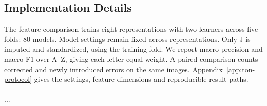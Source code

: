 \documentclass{article}
\begin{document}
    \subsection{Implementation Details}
The feature comparison trains eight representations with two learners across five folds: 80 models. Model settings remain fixed across representations. Only J is imputed and standardized, using the training fold. We report macro-precision and macro-F1 over A--Z, giving each letter equal weight. A paired comparison counts corrected and newly introduced errors on the same images. Appendix~\ref{app:ton-protocol} gives the settings, feature dimensions and reproducible result paths.
\leavevmode 
        \\\\
        ...
        \\\\
        
\end{document}
